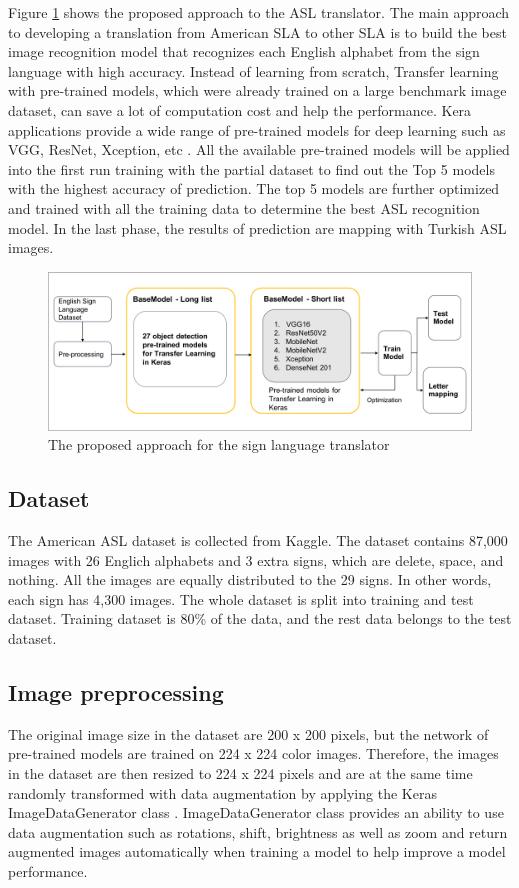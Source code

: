Figure \ref{fig:the proposed approach} shows the proposed approach to the ASL translator. The main approach to developing a translation from American SLA to other SLA is to build the best image recognition model that recognizes each English alphabet from the sign language with high accuracy. Instead of learning from scratch, Transfer learning with pre-trained models, which were already trained on a large benchmark image dataset, can save a lot of computation cost and help the performance. Kera applications provide a wide range of pre-trained models for deep learning such as VGG, ResNet, Xception, etc \cite{keras}. All the available pre-trained models will be applied into the first run training with the partial dataset to find out the Top 5 models with the highest accuracy of prediction. The top 5 models are further optimized and trained with all the training data to determine the best ASL recognition model. In the last phase, the results of prediction are mapping with Turkish ASL images.

\begin{figure}[h]
    \centering
    \caption{The proposed approach for the sign language translator}
	\label{fig:the proposed approach}
    \includegraphics[width=\linewidth]{figures/The approach}
\end{figure}


\subsection{Dataset}
The American ASL dataset is collected from Kaggle. The dataset contains 87,000 images with 26 Englich alphabets and 3 extra signs, which are delete, space, and nothing. All the images are equally distributed to the 29 signs. In other words, each sign has 4,300 images. The whole dataset is split into training and test dataset. Training dataset is 80\% of the data, and the rest data belongs to the test dataset. 


\subsection{Image preprocessing}
The original image size in the dataset are 200 x 200 pixels, but the network of pre-trained models are trained on 224 x 224 color images. Therefore, the images in the dataset are then resized to 224 x 224 pixels and are at the same time randomly transformed with data augmentation by applying the Keras ImageDataGenerator class \cite{keras}. ImageDataGenerator class provides an ability to use data augmentation such as rotations, shift, brightness as well as zoom and return augmented images automatically when training a model to help improve a model performance.

